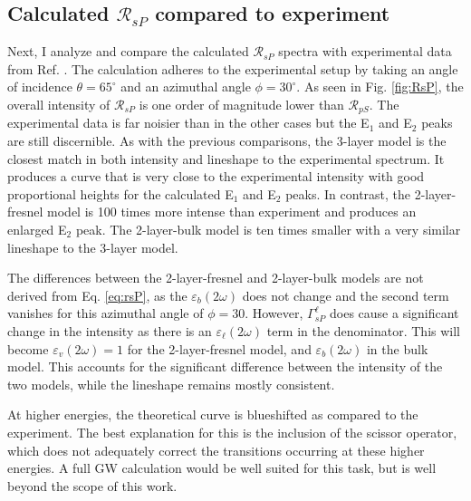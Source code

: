 
\subsection{Calculated \texorpdfstring{$\mathcal{R}_{sP}$}{RsP} compared to 
experiment}\label{sec:RsP}

Next, I analyze and compare the calculated $\mathcal{R}_{sP}$ spectra with
experimental data from Ref. \cite{mejiaPRB02}. The calculation adheres to the
experimental setup by taking an angle of incidence $\theta=65^{\circ}$ and an
azimuthal angle $\phi=30^\circ$. As seen in Fig. \ref{fig:RsP}, the overall
intensity of $\mathcal{R}_{sP}$ is one order of magnitude lower than
$\mathcal{R}_{pS}$. The experimental data is far noisier than in the other cases
but the E$_{1}$ and E$_{2}$ peaks are still discernible. As with the previous
comparisons, the 3-layer model is the closest match in both intensity and
lineshape to the experimental spectrum. It produces a curve that is very close
to the experimental intensity with good proportional heights for the calculated
E$_{1}$ and E$_{2}$ peaks. In contrast, the 2-layer-fresnel model is 100 times
more intense than experiment and produces an enlarged E$_{2}$ peak. The
2-layer-bulk model is ten times smaller with a very similar lineshape to the
3-layer model.

The differences between the 2-layer-fresnel and 2-layer-bulk models are not
derived from Eq. \eqref{eq:rsP}, as the $\varepsilon_{b}(2\omega)$ does not
change and the second term vanishes for this azimuthal angle of $\phi = 30$.
However, $\Gamma^{\ell}_{sP}$ does cause a significant change in the intensity
as there is an $\varepsilon_{\ell}(2\omega)$ term in the denominator. This will
become $\varepsilon_{v}(2\omega) = 1$ for the 2-layer-fresnel model, and
$\varepsilon_{b}(2\omega)$ in the bulk model. This accounts for the significant
difference between the intensity of the two models, while the lineshape remains
mostly consistent.

At higher energies, the theoretical curve is blueshifted as compared to the
experiment. The best explanation for this is the inclusion of the scissor
operator, which does not adequately correct the transitions occurring at these
higher energies. A full GW calculation would be well suited for this task, but
is well beyond the scope of this work.

